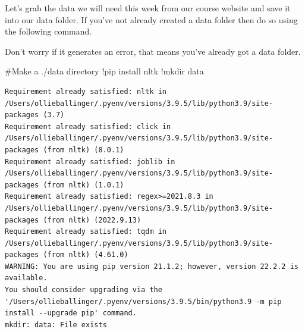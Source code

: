 \documentclass[
  letterpaper,
  DIV=11,
  numbers=noendperiod]{scrreprt}
\newenvironment{Shaded}{\begin{snugshade}}{\end{snugshade}}
\newcommand{\CommentTok}[1]{\textcolor[rgb]{0.37,0.37,0.37}{#1}}
\newcommand{\NormalTok}[1]{\textcolor[rgb]{0.00,0.23,0.31}{#1}}
\newcommand{\OperatorTok}[1]{\textcolor[rgb]{0.37,0.37,0.37}{#1}}
\begin{document}
Let's grab the data we will need this week from our course website and
save it into our data folder. If you've not already created a data
folder then do so using the following command.

Don't worry if it generates an error, that means you've already got a
data folder.

\begin{Shaded}
\begin{Highlighting}[]
\CommentTok{\#Make a ./data directory}
\OperatorTok{!}\NormalTok{pip install nltk}
\OperatorTok{!}\NormalTok{mkdir data}
\end{Highlighting}
\end{Shaded}

\begin{verbatim}
Requirement already satisfied: nltk in /Users/ollieballinger/.pyenv/versions/3.9.5/lib/python3.9/site-packages (3.7)
Requirement already satisfied: click in /Users/ollieballinger/.pyenv/versions/3.9.5/lib/python3.9/site-packages (from nltk) (8.0.1)
Requirement already satisfied: joblib in /Users/ollieballinger/.pyenv/versions/3.9.5/lib/python3.9/site-packages (from nltk) (1.0.1)
Requirement already satisfied: regex>=2021.8.3 in /Users/ollieballinger/.pyenv/versions/3.9.5/lib/python3.9/site-packages (from nltk) (2022.9.13)
Requirement already satisfied: tqdm in /Users/ollieballinger/.pyenv/versions/3.9.5/lib/python3.9/site-packages (from nltk) (4.61.0)
WARNING: You are using pip version 21.1.2; however, version 22.2.2 is available.
You should consider upgrading via the '/Users/ollieballinger/.pyenv/versions/3.9.5/bin/python3.9 -m pip install --upgrade pip' command.
mkdir: data: File exists
\end{verbatim}
\end{document}
